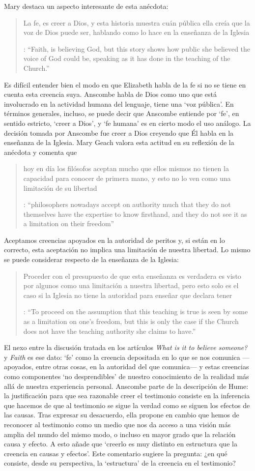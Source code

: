 Mary destaca un aspecto interesante de esta anécdota: \blockquote[{\cite[xvi-xvii]{anscombe2008faith}}: \enquote{Faith, \textelp{} is believing God, but this story shows how public she believed the voice of God could be, speaking as it has done in the teaching of the Church.}]{La fe, \textelp{} es creer a Dios, y esta historia muestra cuán pública ella creía que la voz de Dios puede ser, hablando como lo hace en la enseñanza de la Iglesia}. Es difícil entender bien el modo en que Elizabeth habla de la fe si no se tiene en cuenta esta creencia suya. Anscombe habla de Dios como uno que está involucrado en la actividad humana del lenguaje, tiene una `voz pública'. En términos generales, incluso, se puede decir que Anscombe entiende por `fe', en sentido estricto, `creer a Dios', y `fe humana' es en cierto modo el uso análogo. La decisión tomada por Anscombe fue creer a Dios creyendo que Él habla en la enseñanza de la Iglesia. Mary Geach valora esta actitud en su reflexión de la anécdota y comenta que \blockquote[{\cite[xvii]{anscombe2008faith}}: \enquote{philosophers nowadays accept on authority much that they do not themselves have the expertise to know firsthand, and they do not see it as a limitation on their freedom}]{hoy en día los filósofos aceptan mucho que ellos mismos no tienen la capacidad para conocer de primera mano, y esto no lo ven como una limitación de su libertad}. Aceptamos creencias apoyados en la autoridad de peritos y, si están en lo correcto, esta aceptación no implica una limitación de nuestra libertad. Lo mismo se puede considerar respecto de la enseñanza de la Iglesia: \blockquote[{\cite[xvi-xvii]{anscombe2008faith}}: \enquote{To proceed on the assumption that this teaching is true is seen by some as a limitation on one's freedom, but this is only the case if the Church does not have the teaching authority she claims to have.}]{Proceder con el presupuesto de que esta enseñanza es verdadera es visto por algunos como una limitación a nuestra libertad, pero esto solo es el caso si la Iglesia no tiene la autoridad para enseñar que declara tener}.

El nexo entre la discusión tratada en los artículos \emph{What is it to believe someone?} y \emph{Faith} es ese dato: `fe' como la creencia depositada en lo que se nos comunica ---apoyados, entre otras cosas, en la autoridad del que comunica--- y estas creencias como componentes `no desprendibles' de nuestro conocimiento de la realidad más allá de nuestra experiencia personal. Anscombe parte de la descripción de Hume: la justificación para que sea razonable creer el testimonio consiste en la inferencia que hacemos de que al testimonio se sigue la verdad como se siguen los efectos de las causas. Tras expresar su desacuerdo, ella propone en cambio que hemos de reconocer al testimonio como un medio que nos da acceso a una visión más amplia del mundo del mismo modo, o incluso en mayor grado que la relación causa y efecto. A esto añade que \enquote*{creerlo es muy distinto en estructura que la creencia en causas y efectos}. Este comentario sugiere la pregunta: ¿en qué consiste, desde su perspectiva, la `estructura' de la creencia en el testimonio?

